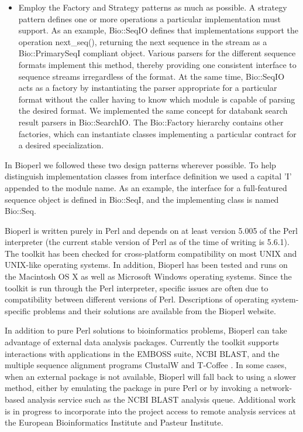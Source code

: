 \documentclass[12pt]{article}
\begin{document}
\begin{itemize}
\item Employ the Factory and Strategy patterns as much as possible. A
strategy pattern defines one or more operations a particular
implementation must support. As an example, Bio::SeqIO defines that
implementations support the operation next_seq(), returning the next
sequence in the stream as a Bio::PrimarySeqI compliant object. Various
parsers for the different sequence formats implement this method,
thereby providing one consistent interface to sequence streams
irregardless of the format. At the same time, Bio::SeqIO acts as a
factory by instantiating the parser appropriate for a particular
format without the caller having to know which module is capable of
parsing the desired format. We implemented the same concept for
databank search result parsers in Bio::SearchIO. The Bio::Factory
hierarchy contains other factories, which can instantiate classes
implementing a particular contract for a desired specialization.

\end{itemize}

In Bioperl we followed these two design patterns \cite{gangoffour}
wherever possible.  To help distinguish implementation classes from
interface definition we used a capital 'I' appended to the module
name. As an example, the interface for a full-featured sequence object
is defined in Bio::SeqI, and the implementing class is named Bio::Seq.

Bioperl is written purely in Perl and depends on at least version
5.005 of the Perl interpreter (the current stable version of Perl as
of the time of writing is 5.6.1).  The toolkit has been checked for
cross-platform compatibility on most UNIX and UNIX-like operating
systems.  In addition, Bioperl has been tested and runs on the
Macintosh OS X as well as Microsoft Windows operating systems.  Since
the toolkit is run through the Perl interpreter, specific issues are
often due to compatibility between different versions of Perl.
Descriptions of operating system-specific problems and their solutions
are available from the Bioperl website.

In addition to pure Perl solutions to bioinformatics problems, Bioperl
can take advantage of external data analysis packages.  Currently the
toolkit supports interactions with applications in the EMBOSS
\cite{emboss} suite, NCBI BLAST, and the multiple sequence alignment
programs ClustalW \cite{clustalw} and T-Coffee \cite{tcoffee}.  In
some cases, when an external package is not available, Bioperl will
fall back to using a slower method, either by emulating the package in
pure Perl or by invoking a network-based analysis service such as the
NCBI BLAST analysis queue.  Additional work is in progress to
incorporate into the project access to remote analysis services at the
European Bioinformatics Institute and Pasteur Institute.
\end{document}
